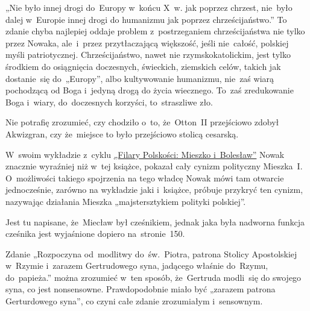 \documentclass[a4paper,11pt]{article}
\begin{document}
\vspace{\spaceFour}



\start {} „Nie było innej drogi do~Europy w~końcu X~w.
jak poprzez chrzest, nie~było dalej w~Europie innej drogi do humanizmu
jak poprzez chrześcijaństwo.” To zdanie chyba najlepiej oddaje
problem z~postrzeganiem chrześcijaństwa nie tylko przez Nowaka,
ale~i~przez przytłaczającą większość, jeśli nie~całość, polskiej myśli
patriotycznej. Chrześcijaństwo, nawet nie rzymskokatolickim,
jest tylko środkiem do osiągnięcia doczesnych, świeckich, ziemskich
celów, takich jak dostanie~się do~„Europy”, albo kultywowanie
humanizmu, nie~zaś wiarą pochodzącą od Boga i~jedyną drogą do życia
wiecznego. To~zaś zredukowanie Boga i~wiary, do~doczesnych korzyści,
to~straszliwe zło.

\vspace{\spaceFour}



\start {} Nie potrafię zrozumieć, czy chodziło o~to,
że~Otton~II przejściowo zdobył Akwizgran, czy że~miejsce to było
przejściowo stolicą cesarską.

\vspace{\spaceFour}



\start {} W~swoim wykładzie z~cyklu
\href{https://www.youtube.com/watch?v=QovVLT2fitc}{„Filary Polskości:
  Mieszko i~Bolesław”} Nowak znacznie wyraźniej niż w~tej książce,
pokazał cały cynizm polityczny Mieszka~I. O~możliwości takiego
spojrzenia na tego władcę Nowak mówi tam otwarcie jednocześnie,
zarówno na wykładzie jaki i~książce, próbuje przykryć ten cynizm,
nazywając działania Mieszka „majstersztykiem polityki polskiej”.

\vspace{\spaceFour}



\start {} Jest tu napisane, że~Miecław był cześnikiem,
jednak jaka była nadworna funkcja cześnika jest wyjaśnione dopiero
na~stronie~150.

\vspace{\spaceFour}



\start {} Zdanie „Rozpoczyna od~modlitwy
do~św.~Piotra, patrona Stolicy Apostolskiej w~Rzymie i~zarazem
Gertrudowego syna, jadącego właśnie do~Rzymu, do~papieża.” można
zrozumieć w~ten sposób, że~Gertruda modli~się do swojego syna, co jest
nonsensowne. Prawdopodobnie miało być „zarazem patrona Gerturdowego
syna”, co czyni całe zdanie zrozumiałym i~sensownym.
\end{document}
